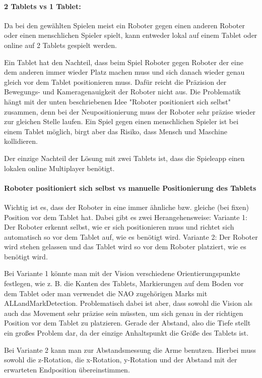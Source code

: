 \paragraph{2 Tablets vs 1 Tablet:}
Da bei den gewählten Spielen meist ein Roboter gegen einen anderen Roboter oder einen menschlichen Spieler spielt, kann entweder lokal auf einem Tablet oder online auf 2 Tablets gespielt werden. 

Ein Tablet hat den Nachteil, dass beim Spiel Roboter gegen Roboter der eine dem anderen immer wieder Platz machen muss und sich danach wieder genau gleich vor dem Tablet positionieren muss. Dafür reicht die Präzision der Bewegungs- und Kameragenauigkeit der Roboter nicht aus. Die Problematik hängt mit der unten beschriebenen Idee "Roboter positioniert sich selbst" zusammen, denn bei der Neupositionierung muss der Roboter sehr präzise wieder zur gleichen Stelle laufen.
Ein Spiel gegen einen menschlichen Spieler ist bei einem Tablet möglich, birgt aber das Risiko, dass Mensch und Maschine kollidieren. 

Der einzige Nachteil der Lösung mit zwei Tablets ist, dass die Spieleapp einen lokalen online Multiplayer benötigt. 

\paragraph{Roboter positioniert sich selbst vs manuelle Positionierung des Tablets}
Wichtig ist es, dass der Roboter in eine immer ähnliche bzw. gleiche (bei fixen) Position vor dem Tablet hat. Dabei gibt es zwei Herangehensweise: 
Variante 1: Der Roboter erkennt selbst, wie er sich positionieren muss und richtet sich automatisch so vor dem Tablet auf, wie es benötigt wird. 
Variante 2: Der Roboter wird stehen gelassen und das Tablet wird so vor dem Roboter platziert, wie es benötigt wird. 

Bei Variante 1 könnte man mit der Vision verschiedene Orientierungspunkte festlegen, wie z. B. die Kanten des Tablets, Markierungen auf dem Boden vor dem Tablet oder man verwendet die NAO zugehörigen Marks mit ALLandMarkDetection. Problematisch dabei ist aber, dass sowohl die Vision als auch das Movement sehr präzise sein müssten, um sich genau in der richtigen Position vor dem Tablet zu platzieren. Gerade der Abstand, also die Tiefe stellt ein großes Problem dar, da der einzige Anhaltspunkt die Größe des Tablets ist. 

Bei Variante 2 kann man zur Abstandsmessung die Arme benutzen. Hierbei muss sowohl die z-Rotation, die x-Rotation, y-Rotation und der Abstand mit der erwarteten Endposition übereinstimmen. 


